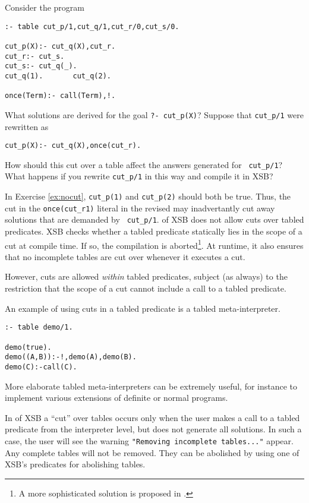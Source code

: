 \begin{exercise} \label{ex:nocut}
Consider the program
\begin{verbatim}
:- table cut_p/1,cut_q/1,cut_r/0,cut_s/0.

cut_p(X):- cut_q(X),cut_r.
cut_r:- cut_s.
cut_s:- cut_q(_).
cut_q(1).       cut_q(2).

once(Term):- call(Term),!.
\end{verbatim}
What solutions are derived for the goal {\tt ?- cut\_p(X)}?  Suppose that
{\tt cut\_p/1} were rewritten as 
\begin{verbatim}
cut_p(X):- cut_q(X),once(cut_r).
\end{verbatim}

How should this cut over a table affect the answers generated for {\tt
cut\_p/1}?  What happens if you rewrite {\tt cut\_p/1} in this way and
compile it in XSB?
\end{exercise}

In Exercise \ref{ex:nocut}, {\tt cut\_p(1)} and {\tt cut\_p(2)} should
both be true.  Thus, the cut in the {\tt once(cut\_r1)} literal in the
revised may inadvertantly cut away solutions that are demanded by {\tt
cut\_p/1}.  \version{} of XSB does not allow cuts over tabled
predicates.  XSB checks whether a tabled predicate statically lies in
the scope of a cut at compile time.  If so, the compilation is
aborted\footnote{A more sophisticated solution is proposed in
\cite{Swif99b}.}. At runtime, it also ensures that no incomplete
tables are cut over whenever it executes a cut.

However, cuts are allowed {\em within} tabled predicates, subject (as
always) to the restriction that the scope of a cut cannot include a
call to a tabled predicate.

\begin{example}
An example of using cuts in a tabled predicate is a tabled
meta-interpreter.
\begin{verbatim}
:- table demo/1.

demo(true).
demo((A,B)):-!,demo(A),demo(B).
demo(C):-call(C).
\end{verbatim}
More elaborate tabled meta-interpreters can be extremely useful, for
instance to implement various extensions of definite or normal
programs.
\end{example}

In \version{} of XSB a ``cut'' over tables occurs only when the user
makes a call to a tabled predicate from the interpreter level, but
does not generate all solutions.  In such a case, the user will see
the warning {\tt "Removing incomplete tables..."} appear.  Any
complete tables will not be removed.  They can be abolished by using
one of XSB's predicates for abolishing tables.

